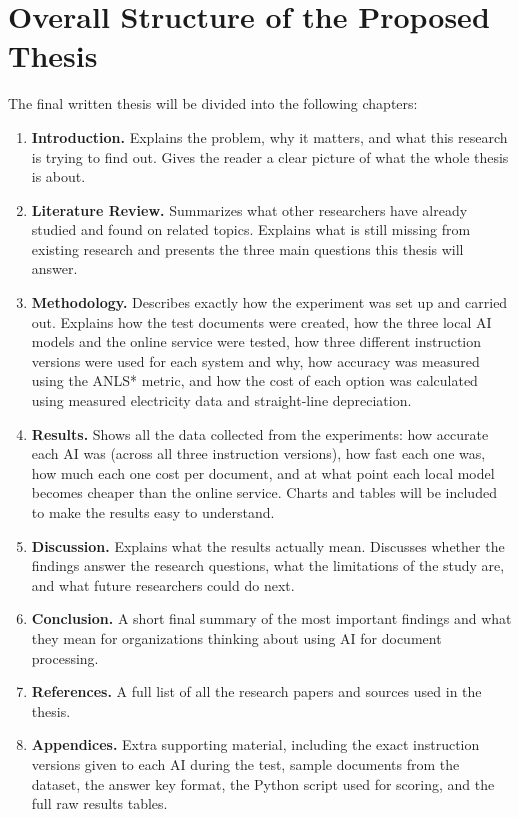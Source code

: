 \section{Overall Structure of the Proposed Thesis}
\label{sec:structure}

The final written thesis will be divided into the following chapters:

\begin{enumerate}
    \item \textbf{Introduction.} Explains the problem, why it matters, and what this research is trying to find out. Gives the reader a clear picture of what the whole thesis is about.

    \item \textbf{Literature Review.} Summarizes what other researchers have already studied and found on related topics. Explains what is still missing from existing research and presents the three main questions this thesis will answer.

    \item \textbf{Methodology.} Describes exactly how the experiment was set up and carried out. Explains how the test documents were created, how the three local AI models and the online service were tested, how three different instruction versions were used for each system and why, how accuracy was measured using the ANLS* metric, and how the cost of each option was calculated using measured electricity data and straight-line depreciation.

    \item \textbf{Results.} Shows all the data collected from the experiments: how accurate each AI was (across all three instruction versions), how fast each one was, how much each one cost per document, and at what point each local model becomes cheaper than the online service. Charts and tables will be included to make the results easy to understand.

    \item \textbf{Discussion.} Explains what the results actually mean. Discusses whether the findings answer the research questions, what the limitations of the study are, and what future researchers could do next.

    \item \textbf{Conclusion.} A short final summary of the most important findings and what they mean for organizations thinking about using AI for document processing.

    \item \textbf{References.} A full list of all the research papers and sources used in the thesis.

    \item \textbf{Appendices.} Extra supporting material, including the exact instruction versions given to each AI during the test, sample documents from the dataset, the answer key format, the Python script used for scoring, and the full raw results tables.
\end{enumerate}
